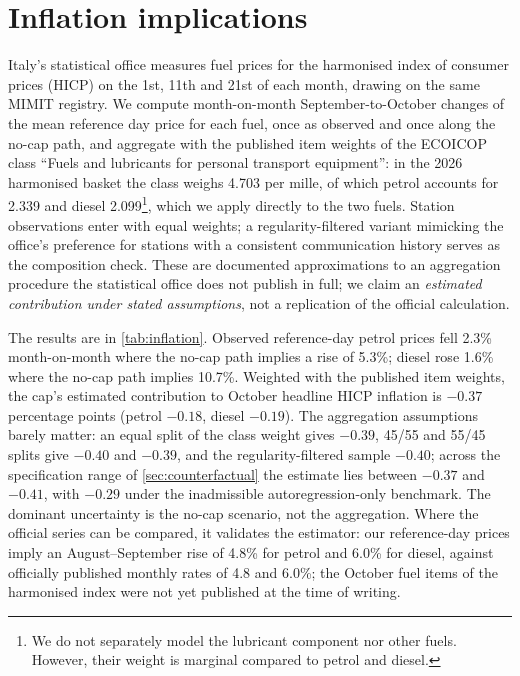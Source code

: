 \documentclass[11pt]{article}
\begin{document}
\section{Inflation implications}\label{sec:inflation}

Italy's statistical office measures fuel prices for the harmonised index
of consumer prices (HICP) on the 1st, 11th and 21st of each month,
drawing on the same MIMIT registry. We compute month-on-month
September-to-October changes of the mean reference day price for each
fuel, once as observed and once along the no-cap path, and aggregate with
the published item weights of the ECOICOP class ``Fuels and lubricants
for personal transport equipment'': in the 2026 harmonised basket the
class weighs 4.703 per mille, of which petrol accounts for 2.339 and
diesel 2.099\footnote{We do not separately model the lubricant component nor other fuels.
However, their weight is marginal compared to petrol and diesel.}, which
we apply directly to the two fuels. Station observations enter with equal
weights; a regularity-filtered variant mimicking the office's preference
for stations with a consistent communication history serves as the
composition check. These are documented approximations to an aggregation
procedure the statistical office does not publish in full; we claim an
\emph{estimated contribution under stated assumptions}, not a replication
of the official calculation.



The results are in \cref{tab:inflation}. Observed reference-day petrol
prices fell 2.3\% month-on-month where the no-cap path implies a rise of
5.3\%; diesel rose 1.6\% where the no-cap path implies 10.7\%. Weighted
with the published item weights, the cap's estimated contribution to
October headline HICP inflation is $-0.37$ percentage points (petrol
$-0.18$, diesel $-0.19$). The aggregation assumptions barely matter: an
equal split of the class weight gives $-0.39$, 45/55 and 55/45 splits
give $-0.40$ and $-0.39$, and the regularity-filtered sample $-0.40$;
across the specification range of \cref{sec:counterfactual} the estimate
lies between $-0.37$ and $-0.41$, with $-0.29$ under the inadmissible
autoregression-only benchmark. The dominant uncertainty is the no-cap
scenario, not the aggregation. Where the official series can be compared,
it validates the estimator: our reference-day prices imply an
August--September rise of 4.8\% for petrol and 6.0\% for diesel, against
officially published monthly rates of 4.8 and 6.0\%; the October fuel
items of the harmonised index were not yet published at the time of
writing.
\end{document}
